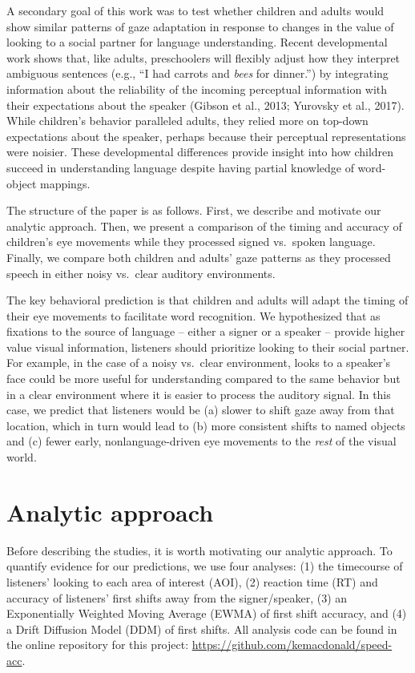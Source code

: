\documentclass[english,floatsintext,man]{apa6}
\begin{document}
A secondary goal of this work was to test whether children and adults
would show similar patterns of gaze adaptation in response to changes in
the value of looking to a social partner for language understanding.
Recent developmental work shows that, like adults, preschoolers will
flexibly adjust how they interpret ambiguous sentences (e.g., \enquote{I
had carrots and \emph{bees} for dinner.}) by integrating information
about the reliability of the incoming perceptual information with their
expectations about the speaker (Gibson et al., 2013; Yurovsky et al.,
2017). While children's behavior paralleled adults, they relied more on
top-down expectations about the speaker, perhaps because their
perceptual representations were noisier. These developmental differences
provide insight into how children succeed in understanding language
despite having partial knowledge of word-object mappings.

The structure of the paper is as follows. First, we describe and
motivate our analytic approach. Then, we present a comparison of the
timing and accuracy of children's eye movements while they processed
signed vs.~spoken language. Finally, we compare both children and
adults' gaze patterns as they processed speech in either noisy vs.~clear
auditory environments.

The key behavioral prediction is that children and adults will adapt the
timing of their eye movements to facilitate word recognition. We
hypothesized that as fixations to the source of language -- either a
signer or a speaker -- provide higher value visual information,
listeners should prioritize looking to their social partner. For
example, in the case of a noisy vs.~clear environment, looks to a
speaker's face could be more useful for understanding compared to the
same behavior but in a clear environment where it is easier to process
the auditory signal. In this case, we predict that listeners would be
(a) slower to shift gaze away from that location, which in turn would
lead to (b) more consistent shifts to named objects and (c) fewer early,
nonlanguage-driven eye movements to the \emph{rest} of the visual world.

\hypertarget{analytic-approach}{%
\section{Analytic approach}\label{analytic-approach}}

Before describing the studies, it is worth motivating our analytic
approach. To quantify evidence for our predictions, we use four
analyses: (1) the timecourse of listeners' looking to each area of
interest (AOI), (2) reaction time (RT) and accuracy of listeners' first
shifts away from the signer/speaker, (3) an Exponentially Weighted
Moving Average (EWMA) of first shift accuracy, and (4) a Drift Diffusion
Model (DDM) of first shifts. All analysis code can be found in the
online repository for this project:
\url{https://github.com/kemacdonald/speed-acc}.
\end{document}
